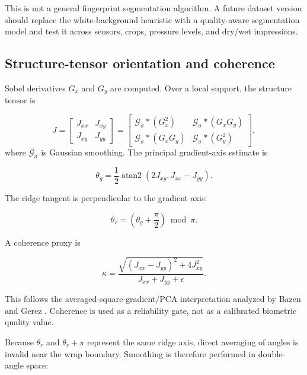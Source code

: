\documentclass[11pt]{article}
\begin{document}
This is not a general fingerprint segmentation algorithm. A future dataset version should replace the white-background heuristic with a quality-aware segmentation model and test it across sensors, crops, pressure levels, and dry/wet impressions.

\subsection{Structure-tensor orientation and coherence}

Sobel derivatives $G_x$ and $G_y$ are computed. Over a local support, the structure tensor is

\begin{equation}
J = \begin{bmatrix}
J_{xx} & J_{xy}\\
J_{xy} & J_{yy}
\end{bmatrix}
= \begin{bmatrix}
\mathcal{G}_{\sigma}*(G_x^2) & \mathcal{G}_{\sigma}*(G_xG_y)\\
\mathcal{G}_{\sigma}*(G_xG_y) & \mathcal{G}_{\sigma}*(G_y^2)
\end{bmatrix},
\end{equation}
where $\mathcal{G}_{\sigma}$ is Gaussian smoothing. The principal gradient-axis estimate is

\begin{equation}
\theta_g = \frac{1}{2}\operatorname{atan2}(2J_{xy},J_{xx}-J_{yy}).
\end{equation}

The ridge tangent is perpendicular to the gradient axis:

\begin{equation}
\theta_r = \left(\theta_g + \frac{\pi}{2}\right) \bmod \pi.
\end{equation}

A coherence proxy is

\begin{equation}
\kappa = \frac{\sqrt{(J_{xx}-J_{yy})^2 + 4J_{xy}^2}}{J_{xx}+J_{yy}+\epsilon}.
\end{equation}

This follows the averaged-square-gradient/PCA interpretation analyzed by Bazen and Gerez \cite{bazen2002directional}. Coherence is used as a reliability gate, not as a calibrated biometric quality value.

Because $\theta_r$ and $\theta_r+\pi$ represent the same ridge axis, direct averaging of angles is invalid near the wrap boundary. Smoothing is therefore performed in double-angle space:
\end{document}
